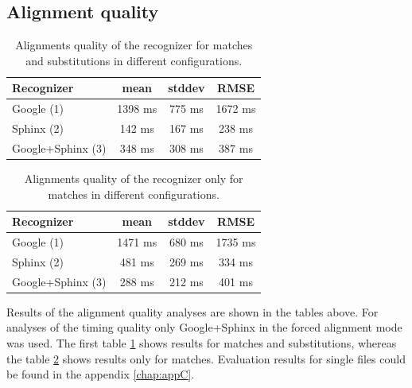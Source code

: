 \subsection {Alignment quality}
\begin {table}
\begin{center}
\caption {Alignments quality of the recognizer for matches and substitutions in
different configurations.}
    \begin{tabular}{l  c  c  c }
   \toprule
    Recognizer & mean & stddev & RMSE \\ \toprule
    Google (1)  & 1398 ms &  775 ms & 1672 ms \\ 
    Sphinx (2)  & 142 ms & 167 ms & 238 ms \\ 
    Google+Sphinx (3)  &  348  ms & 308 ms &  387 ms \\ 
    \bottomrule  
    \end{tabular}
    \label{tab:alnonincremm} 
\end{center}
\end {table}
\begin {table}
\begin{center}
\caption {Alignments quality of the recognizer only for matches 
in different configurations.}
    \begin{tabular}{l  c  c  c }
   \toprule
    Recognizer & mean & stddev & RMSE \\ \toprule
    Google (1)  & 1471 ms & 680 ms & 1735 ms \\ 
    Sphinx (2)  & 481 ms & 269 ms & 334 ms \\ 
    Google+Sphinx (3)  & 288 ms &  212 ms &  401 ms \\ 
    \end{tabular}
    \label{tab:alnonincremms}
\end{center} 
\end {table}
Results of the alignment quality analyses are shown in the tables above.
For analyses of the timing quality only Google+Sphinx in the forced alignment mode
was used. The first table \ref{tab:alnonincremm}   shows results for
matches and substitutions, whereas the table \ref{tab:alnonincremms}
shows results only for matches. Evaluation results for single files could be
found in the appendix \ref{chap:appC}. 

